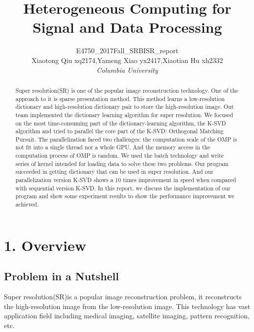 \documentclass[english]{cccconf}
\begin{document}
	
\title{Heterogeneous Computing for Signal and Data Processing}

\author{E4750\_2017Fall\_SRBISR\_report\\Xiaotong Qiu  xq2174,Yameng Xiao  yx2417,Xiaotian Hu    xh2332\\\textsl{Columbia University}}


\maketitle


\begin{abstract}

Super resolution(SR) is one of the popular image reconstruction technology. One of the approach to it is sparse presentation method. This method learns a low-resolution dictionary and high-resolution dictionary pair to store the high-resolution image. Out team implemented the dictionary learning algorithm for super resolution. We focused on the most time-consuming part of the dictionary-learning algorithm, the K-SVD algorithm and tried to parallel the core part of the K-SVD: Orthogonal Matching Pursuit. The parallelization faced two challenges: the computation scale of the OMP is not fit into a single thread nor a whole GPU. And the memory access in the computation process of OMP is random. We used the batch technology and write series of kernel intended for loading data to solve these two problems. Our program succeeded in getting dictionary that can be used in super resolution. And our parallelization version K-SVD shows a 10 times improvement in speed when compared with sequential version K-SVD. In this report, we discuss the implementation of our program and show some experiment results to show the performance improvement we achieved. 
\end{abstract}


\section{1. Overview}

\subsection{Problem in a Nutshell}
Super resolution(SR)\parencite{jianchao_yang_image_2010,timofte_anchored_2013,kaibing_zhang_multi-scale_2012,nasrollahi_super-resolution:_2014}is a popular image reconstruction problem, it reconstructs the high-resolution image from the low-resolution image. This technology has vast application field including medical imaging, satellite imaging, pattern recognition, etc. 
\end{document}
